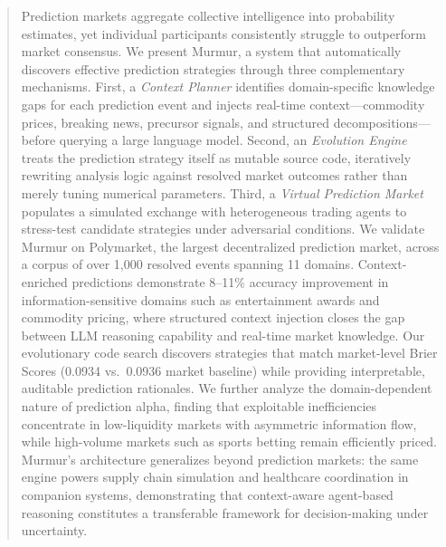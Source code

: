 \begin{abstract}
Prediction markets aggregate collective intelligence into probability estimates, yet individual participants consistently struggle to outperform market consensus. We present Murmur, a system that automatically discovers effective prediction strategies through three complementary mechanisms. First, a \emph{Context Planner} identifies domain-specific knowledge gaps for each prediction event and injects real-time context---commodity prices, breaking news, precursor signals, and structured decompositions---before querying a large language model. Second, an \emph{Evolution Engine} treats the prediction strategy itself as mutable source code, iteratively rewriting analysis logic against resolved market outcomes rather than merely tuning numerical parameters. Third, a \emph{Virtual Prediction Market} populates a simulated exchange with heterogeneous trading agents to stress-test candidate strategies under adversarial conditions. We validate Murmur on Polymarket, the largest decentralized prediction market, across a corpus of over 1{,}000 resolved events spanning 11 domains. Context-enriched predictions demonstrate 8--11\% accuracy improvement in information-sensitive domains such as entertainment awards and commodity pricing, where structured context injection closes the gap between LLM reasoning capability and real-time market knowledge. Our evolutionary code search discovers strategies that match market-level Brier Scores (0.0934 vs.\ 0.0936 market baseline) while providing interpretable, auditable prediction rationales. We further analyze the domain-dependent nature of prediction alpha, finding that exploitable inefficiencies concentrate in low-liquidity markets with asymmetric information flow, while high-volume markets such as sports betting remain efficiently priced. Murmur's architecture generalizes beyond prediction markets: the same engine powers supply chain simulation and healthcare coordination in companion systems, demonstrating that context-aware agent-based reasoning constitutes a transferable framework for decision-making under uncertainty.
\end{abstract}
